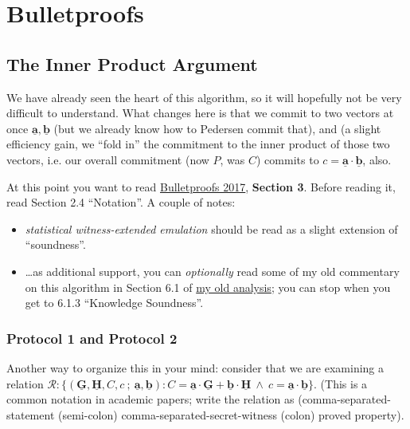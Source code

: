 \documentclass[10pt,a4paper]{article}
\begin{document}
\section{Bulletproofs}

\subsection{The Inner Product Argument}

We have already seen the heart of this algorithm, so it will hopefully not be very difficult to understand. What changes here is that we commit to two vectors at once $\underline{\textbf{a}}, \underline{\textbf{b}}$ (but we already know how to Pedersen commit that), and (a slight efficiency gain, we ``fold in'' the commitment to the inner product of those two vectors, i.e. our overall commitment (now $P$, was $C$) commits to $c = \underline{\textbf{a}} \cdot \underline{\textbf{b}}$, also.

\vspace{5 pt}

At this point you want to read \href{https://eprint.iacr.org/2017/1066.pdf}{Bulletproofs 2017}, \textbf{Section 3}. Before reading it, read Section 2.4 ``Notation''. A couple of notes:

\begin{itemize}
\item \emph{statistical witness-extended emulation} should be read as a slight extension of ``soundness''.
\item \ldots as additional support, you can \emph{optionally} read some of my old commentary on this algorithm in Section 6.1 of \href{https://github.com/AdamISZ/from0k2bp}{my old analysis}; you can stop when you get to 6.1.3 ``Knowledge Soundness''.
\end{itemize}

\vspace{5 pt}

\subsubsection{Protocol 1 and Protocol 2}

Another way to organize this in your mind: consider that we are examining a relation $\mathcal{R}: \{(\underline{\textbf{G}}, \underline{\textbf{H}}, C, c\ ; \ \underline{\textbf{a}}, \underline{\textbf{b}}): C = \underline{\textbf{a}} \cdot \underline{\textbf{G}} + \underline{\textbf{b}} \cdot \underline{\textbf{H}}\ \land\ c = \underline{\textbf{a}} \cdot \underline{\textbf{b}}\}$. (This is a common notation in academic papers; write the relation as (comma-separated-statement (semi-colon) comma-separated-secret-witness (colon) proved property).
\end{document}
